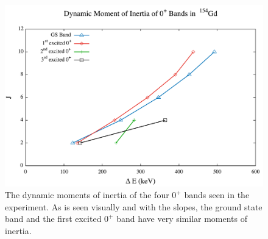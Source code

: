 \begin{figure}[!]
    \centering
    \includegraphics[scale=0.45]{154GdTablesAndFigs/154_Dynamic0.pdf}
    \caption{The dynamic moments of inertia of the four $0^+$ bands seen in the experiment. As is seen visually and with the slopes, the ground state band and the first excited $0^+$ band have very similar moments of inertia.}
    \label{fig:154_Dynamic0}
\end{figure}